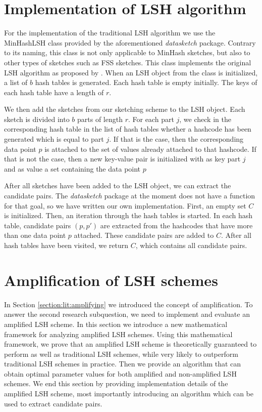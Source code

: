 \section{Implementation of LSH algorithm}
\label{section:lsh_implementation}
For the implementation of the traditional LSH algorithm we use the MinHashLSH class provided by the aforementioned \textit{datasketch} package. Contrary to its naming, this class is not only applicable to MinHash sketches, but also to other types of sketches such as FSS sketches. This class implements the original LSH algorithm as proposed by \cite{IndykM98}. When an LSH object from the class is initialized, a list of $b$ hash tables is generated. Each hash table is empty initially. The keys of each hash table have a length of $r$. 

We then add the sketches from our sketching scheme to the LSH object. Each sketch is divided into $b$ parts of length $r$. For each part $j$, we check in the corresponding hash table in the list of hash tables whether a hashcode has been generated which is equal to part $j$. If that is the case, then the corresponding data point $p$ is attached to the set of values already attached to that hashcode. If that is not the case, then a new key-value pair is initialized with as key part $j$ and as value a set containing the data point $p$

After all sketches have been added to the LSH object, we can extract the candidate pairs. The \textit{datasketch} package at the moment does not have a function for that goal, so we have written our own implementation. First, an empty set $C$ is initialized. Then, an iteration through the hash tables is started. In each hash table, candidate pairs $(p,p')$ are extracted from the hashcodes that have more than one data point $p$ attached. These candidate pairs are added to $C$. After all hash tables have been visited, we return $C$, which contains all candidate pairs.

\section{Amplification of LSH schemes}
\label{section:meth:amplification}
In Section \ref{section:lit:amplifying} we introduced the concept of amplification. To answer the second research subquestion, we need to implement and evaluate an amplified LSH scheme. In this section we introduce a new mathematical framework for analyzing amplified LSH schemes. Using this mathematical framework, we prove that an amplified LSH scheme is theoretically guaranteed to perform as well as traditional LSH schemes, while very likely to outperform traditional LSH schemes in practice. Then we provide an algorithm that can obtain optimal parameter values for both amplified and non-amplified LSH schemes. We end this section by providing implementation details of the amplified LSH scheme, most importantly introducing an algorithm which can be used to extract candidate pairs.

